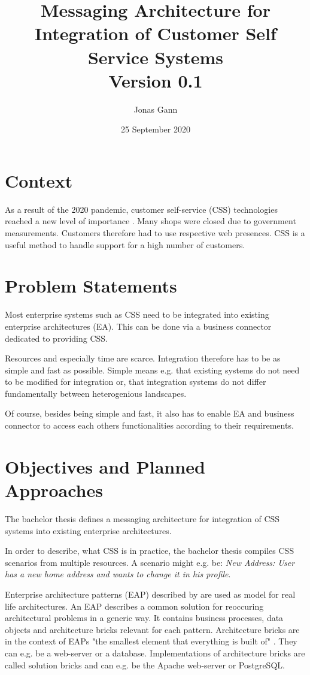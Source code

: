 \documentclass{article}
\title{Messaging Architecture for Integration of Customer Self Service Systems \\ Version 0.1}
\author{Jonas Gann}
\date{25 September 2020}
\begin{document}
\maketitle

\section{Context}

As a result of the 2020 pandemic, customer self-service (CSS) technologies reached a new level of importance \cite{covid}.
Many shops were closed due to government measurements. Customers therefore had to use respective web
presences. CSS is a useful method to handle support for a high number of customers.

\section{Problem Statements}

Most enterprise systems such as CSS need to be integrated into existing enterprise architectures (EA).
This can be done via a business connector dedicated to providing CSS.

Resources and especially time are scarce. Integration therefore has to be as simple and fast as possible.
Simple means e.g. that existing systems do not need to be modified for integration or, 
that integration systems do not differ fundamentally between heterogenious landscapes.

Of course, besides being simple and fast, it also has to enable EA and business connector to access each others 
functionalities according to their requirements.

\section{Objectives and Planned Approaches}

The bachelor thesis defines a messaging architecture for integration of CSS systems into existing enterprise
architectures.

In order to describe, what CSS is in practice, the bachelor thesis compiles CSS scenarios from multiple
resources. A scenario might e.g. be: \textit{New Address: User has a new home address and wants to change it in his profile}.

Enterprise architecture patterns (EAP) described by \cite{architecturePatterns} are used as model for
real life architectures. An EAP describes a common solution for reoccuring architectural problems in a 
generic way. It contains business processes, data objects and architecture bricks relevant for each pattern.
Architecture bricks are in the context of EAPs "the smallest element that everything is built of" 
\cite[Page 21]{architecturePatterns}. They can e.g. be a web-server or a database. Implementations of 
architecture bricks are called solution bricks and can e.g. be the Apache web-server or PostgreSQL.
\end{document}
